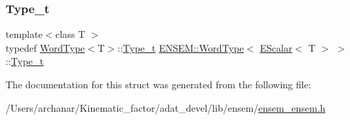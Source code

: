 \mbox{\label{structENSEM_1_1WordType_3_01EScalar_3_01T_01_4_01_4_adc30dc1892bde666c3cbe7a8ea951497}} 
\subsubsection{\texorpdfstring{Type\_t}{Type\_t}\hspace{0.1cm}{\footnotesize\ttfamily [2/2]}}
{\footnotesize\ttfamily template$<$class T $>$ \\
typedef \mbox{\hyperlink{structENSEM_1_1WordType}{Word\+Type}}$<$T$>$\+::\mbox{\hyperlink{structENSEM_1_1WordType_3_01EScalar_3_01T_01_4_01_4_adc30dc1892bde666c3cbe7a8ea951497}{Type\+\_\+t}} \mbox{\hyperlink{structENSEM_1_1WordType}{E\+N\+S\+E\+M\+::\+Word\+Type}}$<$ \mbox{\hyperlink{classENSEM_1_1EScalar}{E\+Scalar}}$<$ T $>$ $>$\+::\mbox{\hyperlink{structENSEM_1_1WordType_3_01EScalar_3_01T_01_4_01_4_adc30dc1892bde666c3cbe7a8ea951497}{Type\+\_\+t}}}



The documentation for this struct was generated from the following file\+:\begin{DoxyCompactItemize}
\item 
/\+Users/archanar/\+Kinematic\+\_\+factor/adat\+\_\+devel/lib/ensem/\mbox{\hyperlink{lib_2ensem_2ensem__ensem_8h}{ensem\+\_\+ensem.\+h}}\end{DoxyCompactItemize}
